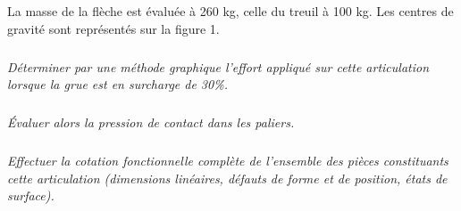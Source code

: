 \documentclass[10pt]{article}
\begin{document}
La masse de la flèche est évaluée à 260 kg, celle du treuil à 100 kg. Les centres de gravité sont représentés sur la figure 1. 

\subparagraph{}
\textit{Déterminer par une méthode graphique l'effort appliqué sur cette articulation lorsque la grue est en surcharge de 30\%.}

\subparagraph{}
\textit{Évaluer alors la pression de contact dans les paliers. }

\subparagraph{}
\textit{Effectuer la cotation fonctionnelle complète de l'ensemble des pièces constituants cette articulation (dimensions linéaires, défauts de forme et de position, états de surface).}

\begin{center}

\end{center}
\end{document}
